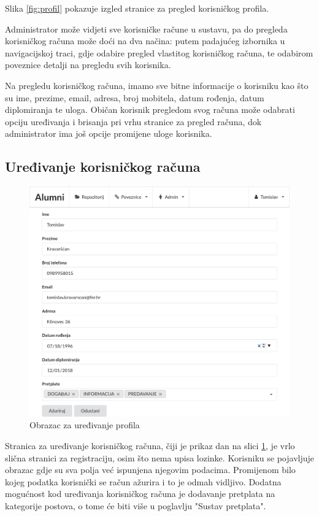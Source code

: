 \documentclass[zavrsni, numeric]{fer}
\begin{document}
Slika \ref{fig:profil} pokazuje izgled stranice za pregled korisničkog profila.

Administrator može vidjeti sve korisničke račune u sustavu, pa do pregleda korisničkog računa može doći na dva načina: putem padajućeg izbornika u navigacijskoj traci, gdje odabire pregled vlastitog korisničkog računa, te odabirom poveznice detalji na pregledu svih korisnika.

Na pregledu korisničkog računa, imamo sve bitne informacije o korisniku kao što su ime, prezime, email, adresa, broj mobitela, datum rođenja, datum diplomiranja te uloga. Običan korisnik pregledom svog računa može odabrati opciju uređivanja i brisanja pri vrhu stranice za pregled računa, dok administrator ima još opcije promijene uloge korisnika.

\subsection{Uređivanje korisničkog računa}

\begin{figure}[H]
	\centering
	\includegraphics[width=13cm]{slike/uredi-profil.png}
	\caption{Obrazac za uređivanje profila}
	\label{fig:uredi-profil}
\end{figure}

Stranica za uređivanje korisničkog računa, čiji je prikaz dan na slici \ref{fig:uredi-profil}, je vrlo slična stranici za registraciju, osim što nema upisa lozinke. Korisniku se pojavljuje obrazac gdje su sva polja već ispunjena njegovim podacima. Promijenom bilo kojeg podatka korisnički se račun ažurira i to je odmah vidljivo. Dodatna mogućnost kod uređivanja korisničkog računa je dodavanje pretplata na kategorije postova, o tome će biti više u poglavlju "Sustav pretplata".
\end{document}
